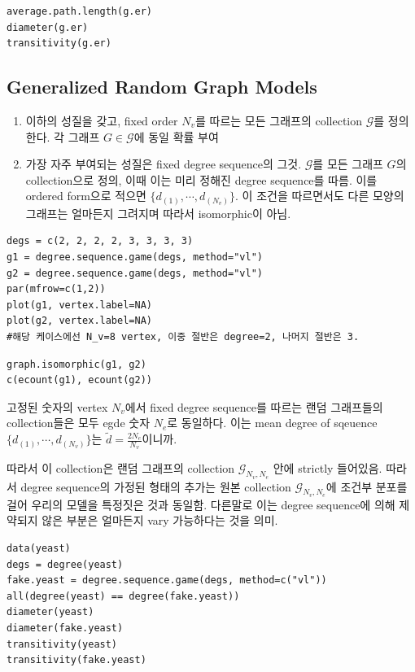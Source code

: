 \documentclass[
]{book}
\begin{document}
{{{\begin{verbatim}
average.path.length(g.er)
diameter(g.er)
transitivity(g.er)
\end{verbatim}

\hypertarget{generalized-random-graph-models}{%
\subsection{Generalized Random Graph Models}\label{generalized-random-graph-models}}

\begin{enumerate}
\def\labelenumi{\arabic{enumi}.}
\item
  이하의 성질을 갖고, fixed order \(N_v\)를 따르는 모든 그래프의 collection \(\mathcal G\)를 정의한다. 각 그래프 \(G \in \mathcal G\)에 동일 확률 부여
\item
  가장 자주 부여되는 성질은 fixed degree sequence의 그것. \(\mathcal G\)를 모든 그래프 \(G\)의 collection으로 정의, 이때 이는 미리 정해진 degree sequence를 따름. 이를 ordered form으로 적으면 \(\{d_{(1)}, \cdots, d_{(N_v)} \}\). 이 조건을 따르면서도 다른 모양의 그래프는 얼마든지 그려지며 따라서 isomorphic이 아님.
\end{enumerate}

\begin{verbatim}
degs = c(2, 2, 2, 2, 3, 3, 3, 3)
g1 = degree.sequence.game(degs, method="vl")
g2 = degree.sequence.game(degs, method="vl")
par(mfrow=c(1,2))
plot(g1, vertex.label=NA)
plot(g2, vertex.label=NA)
#해당 케이스에선 N_v=8 vertex, 이중 절반은 degree=2, 나머지 절반은 3.
\end{verbatim}

\begin{verbatim}
graph.isomorphic(g1, g2)
c(ecount(g1), ecount(g2))
\end{verbatim}

고정된 숫자의 vertex \(N_v\)에서 fixed degree sequence를 따르는 랜덤 그래프들의 collection들은 모두 egde 숫자 \(N_e\)로 동일하다. 이는 mean degree of sqeuence \(\{d_{(1)}, \cdots, d_{(N_v)}\}\)는 \(\tilde d = \frac{2N_e}{N_v}\)이니까.

따라서 이 collection은 랜덤 그래프의 collection \(\mathcal G_{N_v , N_e}\) 안에 strictly 들어있음. 따라서 degree sequence의 가정된 형태의 추가는 원본 collection \(\mathcal G_{N_v , N_e}\)에 조건부 분포를 걸어 우리의 모델을 특정짓은 것과 동일함. 다른말로 이는 degree sequence에 의해 제약되지 않은 부분은 얼마든지 vary 가능하다는 것을 의미.

\begin{verbatim}
data(yeast)
degs = degree(yeast)
fake.yeast = degree.sequence.game(degs, method=c("vl"))
all(degree(yeast) == degree(fake.yeast))
diameter(yeast)
diameter(fake.yeast)
transitivity(yeast)
transitivity(fake.yeast)
\end{verbatim}

}}}
\end{document}
